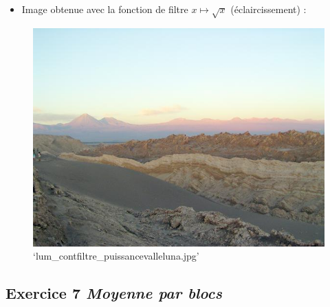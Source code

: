 \documentclass[11pt]{article}
\makeatletter
\def\maxwidth{\ifdim\Gin@nat@width>\linewidth\linewidth
    \else\Gin@nat@width\fi}
\let\Oldincludegraphics\includegraphics
\renewcommand{\includegraphics}[1]{\Oldincludegraphics[width=.8\maxwidth]{#1}}
\providecommand{\tightlist}{%
      \setlength{\itemsep}{0pt}\setlength{\parskip}{0pt}}
\makeatother
\begin{document}
\begin{itemize}
\tightlist
\item
  Image obtenue avec la fonction de filtre \(x \mapsto \sqrt{x}\)
  (éclaircissement) :
\end{itemize}

\begin{figure}
\centering
\includegraphics{lum_contfiltre_puissancevalleluna.jpg}
\caption{`lum\_contfiltre\_puissancevalleluna.jpg'}
\end{figure}

    \hypertarget{exercice-7-moyenne-par-blocs}{%
\subsection{\texorpdfstring{Exercice 7 \emph{Moyenne par
blocs}}{Exercice 7 Moyenne par blocs}}\label{exercice-7-moyenne-par-blocs}}
\end{document}
